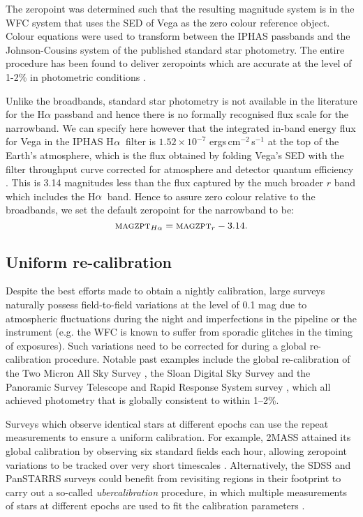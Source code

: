 \documentclass[useAMS,usenatbib]{mn2e}
\def\ha{\mbox{H$\rm \alpha$}}
\begin{document}
The zeropoint was determined such that the resulting magnitude system
is in the WFC system that uses the SED of Vega 
as the zero colour reference object. 
Colour equations were used to transform between the IPHAS passbands 
and the Johnson-Cousins system 
of the published standard star photometry.
The entire procedure has been found to deliver zeropoints which 
are accurate at the level of 1-2\% 
in photometric conditions \citep{Gonzalez-Solares2011}.

Unlike the broadbands, 
standard star photometry is not available in the literature 
for the H$\alpha$ passband
and hence there is no formally recognised flux scale 
for the narrowband.
We can specify here however 
that the integrated in-band energy flux for Vega 
in the IPHAS \ha\ filter 
is $1.52 \times 10^{-7}$ ergs\,cm$^{-2}$\,s$^{-1}$ 
at the top of the Earth's atmosphere,
which is the flux obtained by folding 
Vega's SED with the filter throughput curve 
corrected for atmosphere and detector quantum efficiency
\citep[using the method explained by][]{Drew2005}.
This is 3.14 magnitudes less than the flux captured 
by the much broader $r$ band
which includes the \ha\ band.
Hence to assure zero colour relative to the broadbands,
we set the default zeropoint for the narrowband to be:
\begin{equation}
\textsc{magzpt}_{H\alpha} = \textsc{magzpt}_r - 3.14.
\label{eqn:zpha}
\end{equation}

\subsection{Uniform re-calibration}

Despite the best efforts made to obtain a nightly calibration,
large surveys naturally possess field-to-field variations
at the level of 0.1 mag
due to atmospheric fluctuations during the night
and imperfections in the pipeline or the instrument
(e.g. the WFC is known to suffer from sporadic glitches
in the timing of exposures).
Such variations need to be corrected for 
during a global re-calibration procedure.
Notable past examples include the global re-calibration 
of the Two Micron All Sky Survey \citep[2MASS;][]{Nikolaev2000},
the Sloan Digital Sky Survey \citep[SDSS;][]{Padmanabhan2008}
and the Panoramic Survey Telescope 
and Rapid Response System survey \citep[Pan-STARRS;][]{Schlafly2012},
which all achieved photometry 
that is globally consistent to within 1--2\%.

Surveys which observe identical stars at different epochs
can use the repeat measurements to ensure a uniform calibration.
For example, 2MASS attained its global calibration
by observing six standard fields each hour, 
allowing zeropoint variations to be tracked 
over very short timescales \citep{Nikolaev2000}.
Alternatively, the SDSS and PanSTARRS surveys could benefit
from revisiting regions in their footprint to 
carry out a so-called \emph{ubercalibration} procedure,
in which multiple measurements of stars at different epochs
are used to fit the calibration parameters
\citep{Padmanabhan2008,Schlafly2012}.
\end{document}
